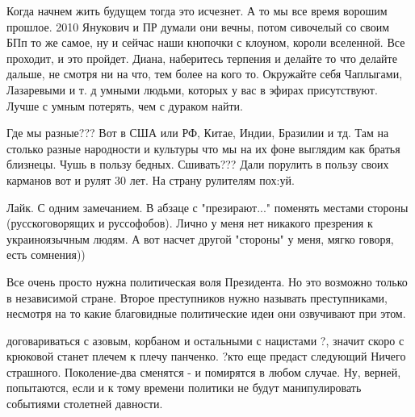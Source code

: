 \begin{itemize}
Когда начнем жить будущем тогда это исчезнет. А то мы все время ворошим
прошлое. 2010 Янукович и ПР думали они вечны, потом сивочелый со своим БПп то
же самое, ну и сейчас наши кнопочки с клоуном, короли вселенной. Все проходит,
и это пройдет. Диана, наберитесь терпения и делайте то что делайте дальше, не
смотря ни на что, тем более на кого то. Окружайте себя Чаплыгами, Лазаревыми и
т. д умными людьми, которых у вас в эфирах присутствуют. Лучше с умным
потерять, чем с дураком найти.


Где мы разные??? Вот в США или РФ, Китае, Индии, Бразилии и тд. Там на столько
разные народности и культуры что мы на их фоне выглядим как братья близнецы.
Чушь в пользу бедных. Сшивать??? Дали порулить в пользу своих карманов вот и
рулят 30 лет. На страну рулителям пох:уй.

Лайк. С одним замечанием. В абзаце с "презирают..." поменять местами стороны
(русскоговорящих и руссофобов). Лично у меня нет никакого презрения к
украиноязычным людям. А вот насчет другой "стороны" у меня, мягко говоря, есть
сомнения))


Все очень просто нужна политическая воля Президента. Но это возможно только в
независимой стране.
Второе преступников нужно называть преступниками, несмотря на то какие
благовидные политические идеи они озвучивают при этом.


договариваться с азовым, корбаном и остальными с нацистами ?, значит скоро с
крюковой станет плечем к плечу панченко. ?кто еще предаст следующий
Ничего страшного. Поколение-два сменятся - и помирятся в любом случае.
Ну, верней, попытаются, если и к тому времени политики не будут манипулировать
событиями столетней давности.


\end{itemize}
